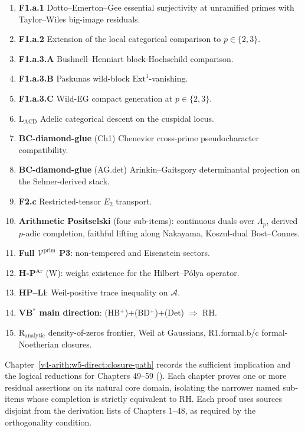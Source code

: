 \begin{enumerate}
\item \textbf{F1.a.1} Dotto--Emerton--Gee essential surjectivity at
unramified primes with Taylor--Wiles big-image residuals.
\item \textbf{F1.a.2} Extension of the local categorical comparison
to \(p\in\{2,3\}\).
\item \textbf{F1.a.3.A} Bushnell--Henniart block-Hochschild
comparison.
\item \textbf{F1.a.3.B} Paskunas wild-block
\(\mathrm{Ext}^{1}\)-vanishing.
\item \textbf{F1.a.3.C} Wild-EG compact generation at \(p\in\{2,3\}\).
\item \textbf{\(\mathrm{L}_{\mathrm{ACD}}\)} Adelic categorical descent
on the cuspidal locus.
\item \textbf{BC-diamond-glue} (Ch1) Chenevier cross-prime
pseudocharacter compatibility.
\item \textbf{BC-diamond-glue} (AG.det) Arinkin--Gaitsgory
determinantal projection on the Selmer-derived stack.
\item \textbf{F2.c} Restricted-tensor \(E_{2}\) transport.
\item \textbf{Arithmetic Positselski} (four sub-items): continuous
duals over \(\Lambda_{p}\), derived \(p\)-adic completion, faithful
lifting along Nakayama, Koszul-dual Bost--Connes.
\item \textbf{Full \(\mathcal{V}^{\mathrm{prim}}\) P3}:
non-tempered and Eisenstein sectors.
\item \textbf{H-P\(^{\mathrm{Ar}}\)} (W): weight existence for the
Hilbert--P\'olya operator.
\item \textbf{HP--Li}: Weil-positive trace inequality on
\(\mathscr A\).
\item \textbf{VB\(^{*}\) main direction}: (HB\(^{+}\))+(BD\(^{+}\))+(Det)
\(\Rightarrow\) RH.
\item \textbf{\(\mathrm{R}_{\mathrm{analytic}}\)} density-of-zeros
frontier, Weil at Gaussians, R1.formal.b/c formal-Noetherian
closures.
\end{enumerate}

Chapter~\ref{v4-arith:w5-direct:closure-path} records the
sufficient implication and the logical reductions for
Chapters 49--59 ().
Each chapter proves one or more residual assertions on its natural
core domain, isolating the narrower named sub-items whose completion
is strictly equivalent to RH. Each proof uses sources disjoint from
the derivation lists of Chapters 1--48, as required by the
orthogonality condition.

